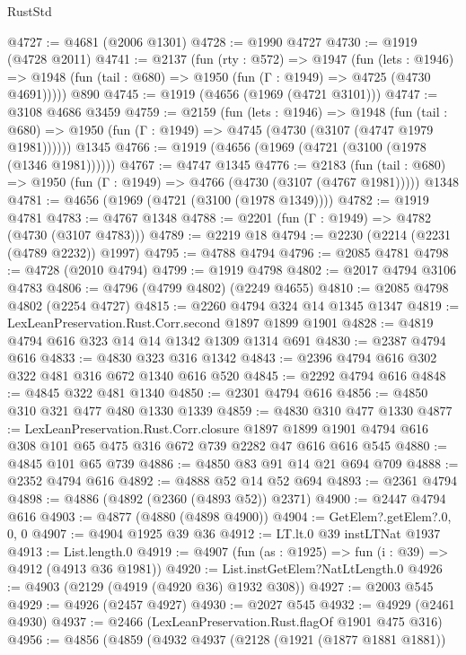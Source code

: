 \begin{lexlean}{RustStd}
\begin{coremodule}
@4727 := @4681 (@2006 @1301)
@4728 := @1990 @4727
@4730 := @1919 (@4728 @2011)
@4741 := @2137
    (fun (rty : @572) =>
    @1947
      (fun (lets : @1946) =>
      @1948 (fun (tail : @680) => @1950 (fun (Γ : @1949) => @4725 (@4730 @4691)))))
    @890
@4745 := @1919 (@4656 (@1969 (@4721 @3101)))
@4747 := @3108 @4686 @3459
@4759 := @2159
    (fun (lets : @1946) =>
    @1948
      (fun (tail : @680) => @1950 (fun (Γ : @1949) => @4745 (@4730 (@3107 (@4747 @1979 @1981))))))
    @1345
@4766 := @1919 (@4656 (@1969 (@4721 (@3100 (@1978 (@1346 @1981))))))
@4767 := @4747 @1345
@4776 := @2183
    (fun (tail : @680) => @1950 (fun (Γ : @1949) => @4766 (@4730 (@3107 (@4767 @1981)))))
    @1348
@4781 := @4656 (@1969 (@4721 (@3100 (@1978 @1349))))
@4782 := @1919 @4781
@4783 := @4767 @1348
@4788 := @2201 (fun (Γ : @1949) => @4782 (@4730 (@3107 @4783)))
@4789 := @2219 @18
@4794 := @2230 (@2214 (@2231 (@4789 @2232)) @1997)
@4795 := @4788 @4794
@4796 := @2085 @4781
@4798 := @4728 (@2010 @4794)
@4799 := @1919 @4798
@4802 := @2017 @4794 @3106 @4783
@4806 := @4796 (@4799 @4802) (@2249 @4655)
@4810 := @2085 @4798 @4802 (@2254 @4727)
@4815 := @2260 @4794 @324 @14 @1345 @1347
@4819 := LexLeanPreservation.Rust.Corr.second @1897 @1899 @1901
@4828 := @4819 @4794 @616 @323 @14 @14 @1342 @1309 @1314 @691
@4830 := @2387 @4794 @616
@4833 := @4830 @323 @316 @1342
@4843 := @2396 @4794 @616 @302 @322 @481 @316 @672 @1340 @616 @520
@4845 := @2292 @4794 @616
@4848 := @4845 @322 @481 @1340
@4850 := @2301 @4794 @616
@4856 := @4850 @310 @321 @477 @480 @1330 @1339
@4859 := @4830 @310 @477 @1330
@4877 := LexLeanPreservation.Rust.Corr.closure
    @1897
    @1899
    @1901
    @4794
    @616
    @308
    @101
    @65
    @475
    @316
    @672
    @739
    @2282
    @47
    @616
    @616
    @545
@4880 := @4845 @101 @65 @739
@4886 := @4850 @83 @91 @14 @21 @694 @709
@4888 := @2352 @4794 @616
@4892 := @4888 @52 @14 @52 @694
@4893 := @2361 @4794
@4898 := @4886 (@4892 (@2360 (@4893 @52)) @2371)
@4900 := @2447 @4794 @616
@4903 := @4877 (@4880 (@4898 @4900))
@4904 := GetElem?.getElem?.{0, 0, 0}
@4907 := @4904 @1925 @39 @36
@4912 := LT.lt.{0} @39 instLTNat @1937
@4913 := List.length.{0}
@4919 := @4907 (fun (as : @1925) => fun (i : @39) => @4912 (@4913 @36 @1981))
@4920 := List.instGetElem?NatLtLength.{0}
@4926 := @4903 (@2129 (@4919 (@4920 @36) @1932 @308))
@4927 := @2003 @545
@4929 := @4926 (@2457 @4927)
@4930 := @2027 @545
@4932 := @4929 (@2461 @4930)
@4937 := @2466 (LexLeanPreservation.Rust.flagOf @1901 @475 @316)
@4956 := @4856
    (@4859
      (@4932
        @4937
        (@2128
          (@1921 (@1877 @1881 @1881))

\end{coremodule}
\end{lexlean}
